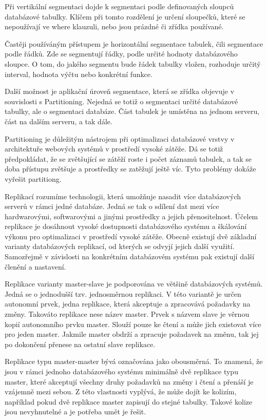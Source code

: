 \documentclass[12pt]{article}
\begin{document}
Při vertikální segmentaci dojde k segmentaci podle definovaných sloupců databázové tabulky. Klíčem při tomto rozdělení je určení sloupečků, které se nepoužívají ve where klauzuli, nebo jsou prázdné či zřídka používané. 

Častěji používáným přístupem je horizontální segmentace tabulek, čili segmentace podle řádků. Zde se segmentují řádky, podle určité hodnoty databázového sloupce. O tom, do jakého segmentu bude řádek tabulky vložen, rozhoduje určitý interval, hodnota výčtu nebo konkrétní funkce.

Další možnost je aplikační úroveň segmentace, která se zřídka objevuje v souvislosti s Partitioning. Nejedná se totiž o segmentaci určité databázové tabulky, ale o segmentaci databáze. Část tabulek je umístěna na jednom serveru, část na dalším serveru, a tak dále.

Partitioning je důležitým nástrojem při optimalizaci databázové vrstvy v architektuře webových systémů v prostředí vysoké zátěže. Dá se totiž předpokládat, že se zvětšující se zátěží roste i počet záznamů tabulek, a tak se doba přístupu zvětšuje a prostředky se zatěžují ještě víc. Tyto problémy dokáže vyřešit partitiong.
\cite{partitioning-db}

Replikací rozumíme technologii, která umožňuje nasadit více databázových serverů v rámci jedné databáze. Jedná se tak o sdílení dat mezi více hardwarovými, softwarovými a jinými prostředky a jejich přenositelnost. Účelem replikace je dosáhnout vysoké dostupnosti databázového systému a škálování výkonu pro optimalizaci v prostředí vysoké zátěže. Obecně existují dvě základní varianty databázových replikací, od kterých se odvyjí jejich další využití. Samozřejmě v závislosti na konkrétním databázovém systému pak existují další členění a nastavení. 

Replikace varianty master-slave je podporována ve většině databázových systémů. Jedná se o jednodušší tzv. jednosměrnou replikaci. V této variantě je určen autonomní prvek, jedna replikace, která akceptuje a zpracovává požadavky na změny. Takováto replikace nese název master. Prvek s názvem slave je věrnou kopií autonomního prvku master. Slouží pouze ke čtení a může jich existovat více pro jeden master. Jakmile master obdrží a zpracuje požadavek na změnu, tak jej po dokončení přenese na ostatní slave replikace.

Replikace typu master-master bývá označována jako obousměrná. To znamená, že jsou v rámci jednoho databázového systému minimálně dvě replikace typu master, které akceptují všechny druhy požadavků na změny i čtení a přenáší je vzájemně mezi sebou. Z této vlastnosti vyplývá, že může dojít ke kolizím, například pokud dvě replikace master zapisují do stejné tabulky. Takové kolize jsou nevyhnutelné a je potřeba umět je řešit.
\end{document}
